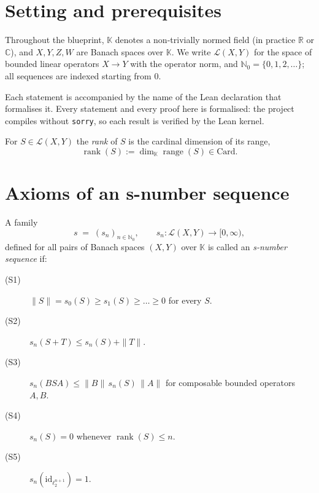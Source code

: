 
\chapter{Setting and prerequisites}
\label{ch:setting}

Throughout the blueprint, $\mathbb{K}$ denotes a non-trivially normed
field (in practice $\mathbb{R}$ or $\mathbb{C}$), and $X, Y, Z, W$ are
Banach spaces over $\mathbb{K}$. We write $\mathcal{L}(X, Y)$ for the
space of bounded linear operators $X \to Y$ with the operator norm, and
$\mathbb{N}_0 = \{0, 1, 2, \dots\}$; all sequences are indexed starting
from $0$.

Each statement is accompanied by the name of the Lean declaration that
formalises it. Every statement and every proof here is formalised: the
project compiles without \texttt{sorry}, so each result is verified by the
Lean kernel.

\begin{definition}
\label{def:rank}
\leanok
For $S \in \mathcal{L}(X, Y)$ the \emph{rank} of $S$ is the cardinal
dimension of its range,
\[
\operatorname{rank}(S) := \dim_{\mathbb{K}} \operatorname{range}(S)
                        \in \mathrm{Card}.
\]
\end{definition}

\chapter{Axioms of an s-number sequence}
\label{ch:axioms}

\begin{definition}
\label{def:s-number-sequence}
\leanok
{}
A family
\[
s \;=\; (s_n)_{n \in \mathbb{N}_0}, \qquad
s_n : \mathcal{L}(X, Y) \longrightarrow [0, \infty),
\]
defined for all pairs of Banach spaces $(X, Y)$ over $\mathbb{K}$ is called an
\emph{\textup{s}-number sequence} if:
\begin{description}
  \item[(S1)]\label{ax:S1} $\|S\| = s_0(S) \ge s_1(S) \ge \dots \ge 0$
        for every $S$.
  \item[(S2)]\label{ax:S2} $s_n(S + T) \le s_n(S) + \|T\|$.
  \item[(S3)]\label{ax:S3} $s_n(BSA) \le \|B\| \, s_n(S) \, \|A\|$ for
        composable bounded operators $A, B$.
  \item[(S4)]\label{ax:S4} $s_n(S) = 0$ whenever $\operatorname{rank}(S) \le n$.
  \item[(S5)]\label{ax:S5} $s_n(\mathrm{id}_{\ell_2^{n+1}}) = 1$.
\end{description}
\end{definition}

